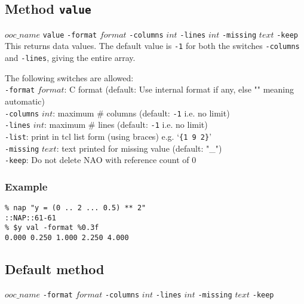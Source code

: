   \subsection{
    \label{value}Method \texttt{value}
  }

  


  $ooc\_name$ 
  \texttt{value} 
  \texttt{-format} 
  $format$ 
  \texttt{-columns} 
  $int$ 
  \texttt{-lines} 
  $int$ 
  \texttt{-missing} 
  $text$ 
  \texttt{-keep}
  \\
  

This returns data values. The default value is 
  \texttt{-1} for both the switches 
  \texttt{-columns} and 
  \texttt{-lines}, giving the entire array.
  

The following switches are allowed:
  \\
  \texttt{-format} 
  $format$: C format (default: Use internal format if any,
  else "" meaning automatic)
  \\
  \texttt{-columns} 
  $int$: maximum \# columns (default: 
  \texttt{-1} i.e. no limit)
  \\
  \texttt{-lines} 
  $int$: maximum \# lines (default: 
  \texttt{-1} i.e. no limit)
  \\
  \texttt{-list}: print in tcl list form (using braces) e.g. `\texttt{\{1 9 2\}}'
  \\
  \texttt{-missing} 
  $text$: text printed for missing value (default:
  "\_")
  \\
  \texttt{-keep}: Do not delete NAO with reference count of 0
  \subsubsection{Example}

  \begin{verbatim}
% nap "y = (0 .. 2 ... 0.5) ** 2"
::NAP::61-61
% $y val -format %0.3f
0.000 0.250 1.000 2.250 4.000
\end{verbatim}

  \subsection{
    \label{default-method}Default method
  }

  


  $ooc\_name$ 
  \texttt{-format} 
  $format$ 
  \texttt{-columns} 
  $int$ 
  \texttt{-lines} 
  $int$ 
  \texttt{-missing} 
  $text$ 
  \texttt{-keep}
  \\
  


